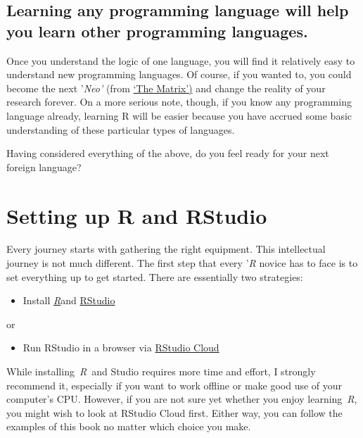 \documentclass[
]{book}
\providecommand{\tightlist}{%
  \setlength{\itemsep}{0pt}\setlength{\parskip}{0pt}}
\begin{document}
\hypertarget{learning-any-programming-language-will-help-you-learn-other-programming-languages.}{%
\section{Learning any programming language will help you learn other programming languages.}\label{learning-any-programming-language-will-help-you-learn-other-programming-languages.}}

Once you understand the logic of one language, you will find it relatively easy to understand new programming languages. Of course, if you wanted to, you could become the next '\emph{Neo'} (from \href{https://www.imdb.com/title/tt0133093/?ref_=ext_shr_lnk}{`The Matrix')} and change the reality of your research forever. On a more serious note, though, if you know any programming language already, learning R will be easier because you have accrued some basic understanding of these particular types of languages.

Having considered everything of the above, do you feel ready for your next foreign language?

\hypertarget{setting-up-r-and-rstudio}{%
\chapter{Setting up R and RStudio}\label{setting-up-r-and-rstudio}}

Every journey starts with gathering the right equipment. This intellectual journey is not much different. The first step that every '\emph{R} novice has to face is to set everything up to get started. There are essentially two strategies:

\begin{itemize}
\tightlist
\item
  Install \href{https://www.r-project.org}{\emph{R}}and \href{https://www.rstudio.com}{RStudio}
\end{itemize}

or

\begin{itemize}
\tightlist
\item
  Run RStudio in a browser via \href{https://rstudio.cloud}{RStudio Cloud}
\end{itemize}

While installing~\emph{R}~and Studio requires more time and effort, I strongly recommend it, especially if you want to work offline or make good use of your computer's CPU. However, if you are not sure yet whether you enjoy learning~\emph{R}, you might wish to look at RStudio Cloud first. Either way, you can follow the examples of this book no matter which choice you make.
\end{document}
